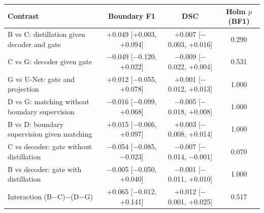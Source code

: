 \begin{tabular}{lccc}
\toprule
Contrast & Boundary F1 & DSC & Holm $p$ (BF1) \\
\midrule
B vs C: distillation given decoder and gate & +0.049 [+0.003, +0.094] & +0.007 [$-$0.003, +0.016] & 0.290 \\
C vs G: decoder given gate & $-$0.049 [$-$0.120, +0.022] & $-$0.009 [$-$0.022, +0.004] & 0.531 \\
G vs U-Net: gate and projection & +0.012 [$-$0.055, +0.078] & +0.001 [$-$0.012, +0.013] & 1.000 \\
D vs G: matching without boundary supervision & $-$0.016 [$-$0.099, +0.068] & $-$0.005 [$-$0.018, +0.008] & 1.000 \\
B vs D: boundary supervision given matching & +0.015 [$-$0.066, +0.097] & +0.003 [$-$0.008, +0.014] & 1.000 \\
C vs decoder: gate without distillation & $-$0.054 [$-$0.085, $-$0.023] & $-$0.007 [$-$0.014, $-$0.001] & 0.070 \\
B vs decoder: gate with distillation & $-$0.005 [$-$0.050, +0.040] & $-$0.001 [$-$0.011, +0.010] & 1.000 \\
Interaction (B$-$C)$-$(D$-$G) & +0.065 [$-$0.012, +0.141] & +0.012 [$-$0.001, +0.025] & 0.517 \\
\bottomrule
\end{tabular}

